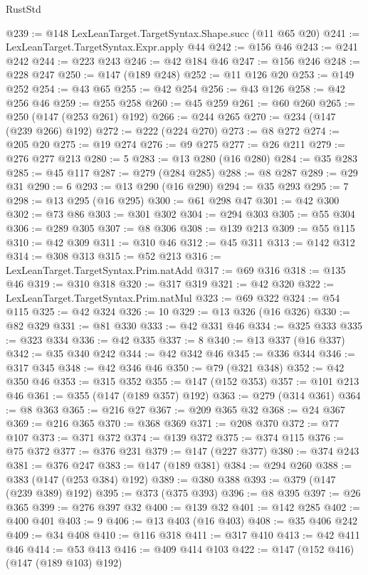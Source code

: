 \begin{lexlean}{RustStd}
\begin{coremodule}
{\begin{coremodule}
{{{{{{{{{{{{{{@239 := @148 LexLeanTarget.TargetSyntax.Shape.succ (@11 @65 @20)
@241 := LexLeanTarget.TargetSyntax.Expr.apply @44
@242 := @156 @46
@243 := @241 @242
@244 := @223 @243
@246 := @42 @184 @46
@247 := @156 @246
@248 := @228 @247
@250 := @147 (@189 @248)
@252 := @11 @126 @20
@253 := @149 @252
@254 := @43 @65
@255 := @42 @254
@256 := @43 @126
@258 := @42 @256 @46
@259 := @255 @258
@260 := @45 @259
@261 := @60 @260
@265 := @250 (@147 (@253 @261) @192)
@266 := @244 @265
@270 := @234 (@147 (@239 @266) @192)
@272 := @222 (@224 @270)
@273 := @8 @272
@274 := @205 @20
@275 := @19 @274
@276 := @9 @275
@277 := @26 @211
@279 := @276 @277 @213
@280 := 5
@283 := @13 @280 (@16 @280)
@284 := @35 @283
@285 := @45 @117
@287 := @279 (@284 @285)
@288 := @8 @287
@289 := @29 @31
@290 := 6
@293 := @13 @290 (@16 @290)
@294 := @35 @293
@295 := 7
@298 := @13 @295 (@16 @295)
@300 := @61 @298 @47
@301 := @42 @300
@302 := @73 @86
@303 := @301 @302
@304 := @294 @303
@305 := @55 @304
@306 := @289 @305
@307 := @8 @306
@308 := @139 @213
@309 := @55 @115
@310 := @42 @309
@311 := @310 @46
@312 := @45 @311
@313 := @142 @312
@314 := @308 @313
@315 := @52 @213
@316 := LexLeanTarget.TargetSyntax.Prim.natAdd
@317 := @69 @316
@318 := @135 @46
@319 := @310 @318
@320 := @317 @319
@321 := @42 @320
@322 := LexLeanTarget.TargetSyntax.Prim.natMul
@323 := @69 @322
@324 := @54 @115
@325 := @42 @324
@326 := 10
@329 := @13 @326 (@16 @326)
@330 := @82 @329
@331 := @81 @330
@333 := @42 @331 @46
@334 := @325 @333
@335 := @323 @334
@336 := @42 @335
@337 := 8
@340 := @13 @337 (@16 @337)
@342 := @35 @340 @242
@344 := @42 @342 @46
@345 := @336 @344
@346 := @317 @345
@348 := @42 @346 @46
@350 := @79 (@321 @348)
@352 := @42 @350 @46
@353 := @315 @352
@355 := @147 (@152 @353)
@357 := @101 @213 @46
@361 := @355 (@147 (@189 @357) @192)
@363 := @279 (@314 @361)
@364 := @8 @363
@365 := @216 @27
@367 := @209 @365 @32
@368 := @24 @367
@369 := @216 @365
@370 := @368 @369
@371 := @208 @370
@372 := @77 @107
@373 := @371 @372
@374 := @139 @372
@375 := @374 @115
@376 := @75 @372
@377 := @376 @231
@379 := @147 (@227 @377)
@380 := @374 @243
@381 := @376 @247
@383 := @147 (@189 @381)
@384 := @294 @260
@388 := @383 (@147 (@253 @384) @192)
@389 := @380 @388
@393 := @379 (@147 (@239 @389) @192)
@395 := @373 (@375 @393)
@396 := @8 @395
@397 := @26 @365
@399 := @276 @397 @32
@400 := @139 @32
@401 := @142 @285
@402 := @400 @401
@403 := 9
@406 := @13 @403 (@16 @403)
@408 := @35 @406 @242
@409 := @34 @408
@410 := @116 @318
@411 := @317 @410
@413 := @42 @411 @46
@414 := @53 @413
@416 := @409 @414 @103
@422 := @147 (@152 @416) (@147 (@189 @103) @192)
}}}}}}}}}}}}}}
\end{coremodule}}
\end{coremodule}
\end{lexlean}
